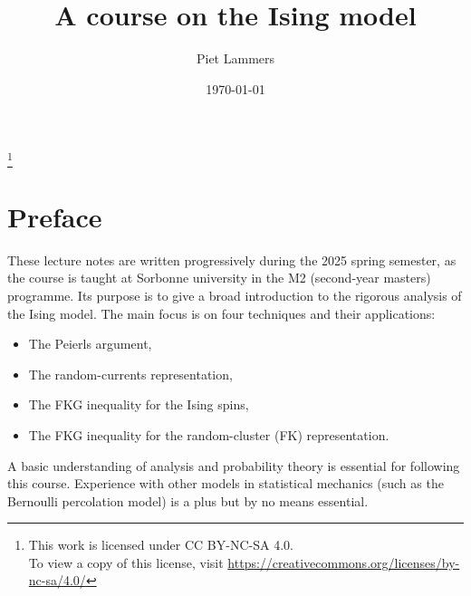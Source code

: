 % 


\makeatletter
{}
\makeatother


\title{A course on the Ising model}


\author{Piet Lammers}
\address{CNRS and Sorbonne Université, LPSM}

\date{\today}

\newcommand\n{\mathbf{n}}
\newcommand\m{\mathbf{m}}
\newcommand\s{\mathbf{s}}
\renewcommand\a{\mathbf{a}}
\renewcommand\b{\mathbf{b}}
\newcommand\f{{\operatorname{f}}}
\newcommand\bfM{\mathbf{M}}
\newcommand\bfP{\mathbf{P}}

\thanks{This work is licensed under CC BY-NC-SA 4.0.\\\indent To view a copy of this license, visit \url{https://creativecommons.org/licenses/by-nc-sa/4.0/}}




\maketitle

\tableofcontents


\section*{Preface}
These lecture notes are written progressively during the 2025 spring semester,
as the course is taught at Sorbonne university in the M2 (second-year masters) programme.
Its purpose is to give a broad introduction to the rigorous analysis of the Ising model.
The main focus is on four techniques and their applications:
\begin{itemize}
    \item The Peierls argument,
    \item The random-currents representation,
    \item The FKG inequality for the Ising spins,
    \item The FKG inequality for the random-cluster (FK) representation.
\end{itemize}

A basic understanding of analysis and probability theory is essential for following this course.
Experience with other models in statistical mechanics (such as the Bernoulli percolation model)
is a plus but by no means essential.

